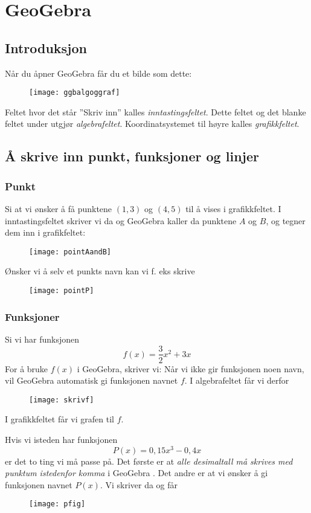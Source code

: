 




\section{GeoGebra}
\subsection{Introduksjon}
Når du åpner GeoGebra får du et bilde som dette:
\begin{figure}[H]
	\centering
	\texttt{[image: ggbalgoggraf]}
\end{figure}
Feltet hvor det står ''Skriv inn'' kalles \textit{inntastingsfeltet}. Dette feltet og det blanke feltet under utgjør \textit{algebrafeltet}. Koordinatsystemet til høyre kalles \textit{grafikkfeltet}.

\subsection{Å skrive inn punkt, funksjoner og linjer}
\subsubsection{Punkt}
Si at vi ønsker å få punktene $ (1,3) $ og $ (4,5) $ til å vises i grafikkfeltet. I inntastingsfeltet skriver vi da
og \vs
{}
GeoGebra kaller da punktene $ A $ og $ B $, og tegner dem inn i grafikfeltet:
\begin{figure}[H]
	\centering
	\texttt{[image: pointAandB]}
\end{figure}
Ønsker vi å selv et punkts navn kan vi f. eks skrive
\begin{figure}[H]
	\centering
	\texttt{[image: pointP]}
\end{figure}
\subsubsection{Funksjoner}
Si vi har funksjonen 
\[f(x)= \frac{3}{2} x^2 + 3x \]
For å bruke $ f(x) $ i GeoGebra, skriver vi:
Når vi ikke gir funksjonen noen navn, vil GeoGebra automatisk gi funksjonen navnet $ f $. I algebrafeltet får vi derfor
\begin{figure}[H]
	\centering
	\texttt{[image: skrivf]}
\end{figure}
I grafikkfeltet får vi grafen til $ f $. \vsk

Hvis vi isteden har funksjonen
\[ P(x)= 0,15x^3 - 0,4 x\]
er det to ting vi må passe på. Det første er at \textsl{alle desimaltall må skrives med punktum istedenfor komma} i GeoGebra
. Det andre er at vi ønsker å gi funksjonen navnet $ P(x) $. Vi skriver da
og får \vspace{-5pt}
\begin{figure}[H]
	\centering
	\texttt{[image: pfig]}
\end{figure}

